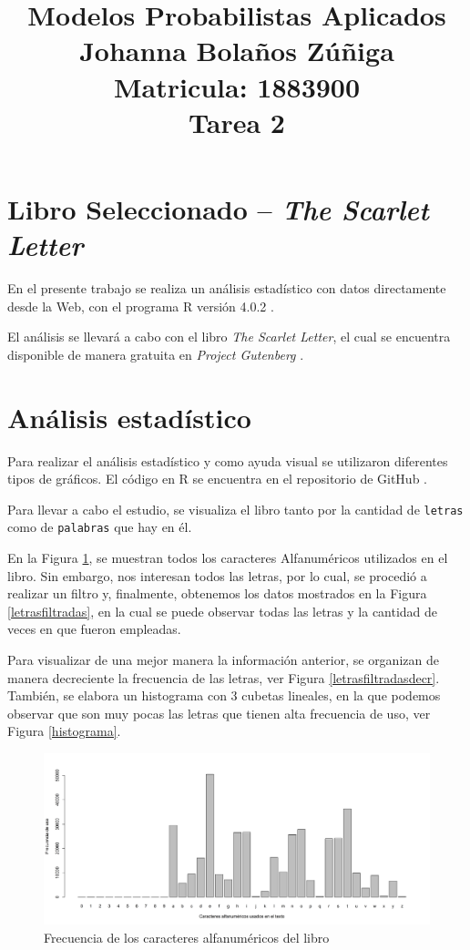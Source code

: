 \documentclass[fontsize=12pt]{article}
\title{
\centering
Modelos Probabilistas Aplicados \\
Johanna Bolaños Zúñiga \\
Matricula: 1883900\\
Tarea 2
}
\date{}
\begin{document}
\maketitle

\section{Libro Seleccionado -- \textit{The Scarlet Letter}}

En el presente trabajo se realiza un análisis estadístico con datos directamente desde la Web, con el programa R versión 4.0.2 \cite{r}.

El análisis se llevará a cabo con el libro \textit{The Scarlet Letter}, el cual se encuentra disponible de manera gratuita en \textit{Project Gutenberg} \cite{libro}.


\section{Análisis estadístico}
Para realizar el análisis estadístico y como ayuda visual se utilizaron diferentes tipos de gráficos. El código en R se encuentra en el repositorio de GitHub \cite{github}. 

Para llevar a cabo el estudio, se visualiza el libro tanto por la cantidad de \texttt{letras} como de \texttt{palabras} que hay en él.

En la Figura \ref{letras}, se muestran todos los caracteres Alfanuméricos utilizados en el libro. Sin embargo, nos interesan todos las letras, por lo cual, se procedió a realizar un filtro y, finalmente, obtenemos los datos mostrados en la Figura \ref{letrasfiltradas}, en la cual se puede observar todas las letras y la cantidad de veces en que fueron empleadas.


Para visualizar de una mejor manera la información anterior, se organizan de manera decreciente la frecuencia de las letras, ver Figura \ref{letrasfiltradasdecr}. También, se elabora un histograma con 3 cubetas lineales, en la que podemos observar que son muy pocas las letras que tienen alta frecuencia de uso, ver Figura \ref{histograma}.


\begin{figure}
\centering
\includegraphics[scale=0.45]{Figures/letrasEnElTexto.png}
\caption{Frecuencia de los caracteres alfanuméricos del libro}
\label{letras}
\end{figure}
\end{document}
